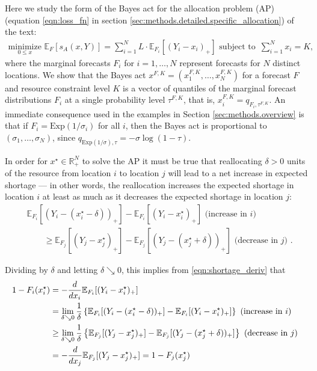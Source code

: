 \documentclass{article}\usepackage[]{graphicx}\usepackage[]{xcolor}
\begin{document}
Here we study the form of the Bayes act for the allocation problem (AP) (equation \eqref{eqn:loss_fn} in section
\ref{sec:methods.detailed.specific_allocation}) of the text:
\begin{align}
    \underset{0 \leq x}{\mathrm{minimize}}\,\, \mathbb{E}_{F} [s_A(x, Y)]= \sum_{i=1}^{N} L \cdot \mathbb{E}_{F_i}[(Y_i - x_i)_{+}]
     \text{ subject to }
     \, \sum_{i=1}^N x_i = K, \label{AP-long}
\end{align}
where the marginal forecasts $F_i$ for $i=1,\dots,N$ represent forecasts for $N$ distinct locations. We show that the
Bayes act $x^{F,K} = (x_1^{F,K},\ldots,x_N^{F,K})$ for a forecast $F$ and resource constraint level $K$ is a vector of
quantiles of the marginal forecast distributions $F_i$ at a single probability level $\tau^{F,K}$, that is, $x_i^{F,K} =
q_{F_i,\tau^{F,K}}$. An immediate consequence used in the examples in Section \ref {sec:methods.overview} is that if
$F_i = \mathrm{Exp}(1/\sigma_i)$ for all $i$, then the Bayes act is proportional to $(\sigma_1,\ldots,\sigma_N)$, since
$q_{\mathrm{Exp}(1/\sigma),\tau} = -\sigma \log(1-\tau)$.

In order for $x^{\star} \in \mathbb{R}^N_{+}$ to solve the AP it must be true that reallocating $\delta > 0$ units of
the resource from location $i$ to location $j$ will lead to a net increase in expected shortage --- in other words, the
reallocation increases the expected shortage in location $i$ at least as much as it decreases the expected shortage
in location $j$:
\begin{align*}
&\mathbb{E}_{F_i}[(Y_i - (x^{\star}_i - \delta))_{+}] - \mathbb{E}_{F_i}[(Y_i - x^{\star}_i)_{+}]
\text{ (increase in $i$) } \nonumber \\
&\qquad \geq
\mathbb{E}_{F_j}[(Y_j - x^{\star}_j)_{+}] - \mathbb{E}_{F_j}[(Y_j - (x^{\star}_j + \delta))_{+}]
\text{ (decrease in $j$) }.
\end{align*}

Dividing by $\delta$ and letting $\delta \searrow 0$, this implies from
\eqref{eqn:shortage_deriv} that
\begin{align}
1-F_i(x^{\star}_i) &= -\frac{d}{dx_i}\mathbb{E}_{F_i}[(Y_i - x^{\star}_i)_{+}] \nonumber \\
&= \lim_{\delta \searrow 0} \frac{1}{\delta}
\left\{\mathbb{E}_{F_i}[(Y_i - (x^{\star}_i - \delta))_{+}] - \mathbb{E}_{F_i}[(Y_i - x^{\star}_i)_{+}]\right\}
\text{ (increase in $i$) } \nonumber \\
&\geq
\lim_{\delta \searrow 0} \frac{1}{\delta}
\left\{\mathbb{E}_{F_j}[(Y_j - x^{\star}_j)_{+}] - \mathbb{E}_{F_j}[(Y_j - (x^{\star}_j + \delta))_{+}]\right\}
\text{ (decrease in $j$) } \nonumber \\
 &= -\frac{d {} }{d {x_j}}\mathbb{E}_{F_j}[(Y_j - x^{\star}_j)_{+}] = 1-F_j(x^{\star}_j) \label{eqn:ASoptimal1}
\end{align}
\end{document}
